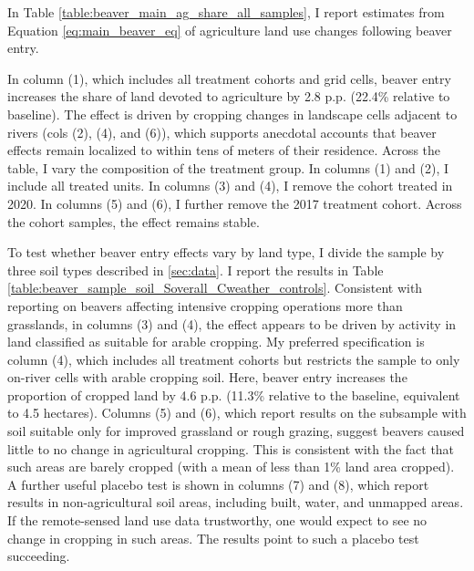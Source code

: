 In Table \ref{table:beaver_main_ag_share_all_samples}, I report estimates from Equation \ref{eq:main_beaver_eq} of agriculture land use changes following beaver entry. 

In column (1), which includes all treatment cohorts and grid cells, beaver entry increases the share of land devoted to agriculture by 2.8 p.p. (22.4\% relative to baseline). The effect is driven by cropping changes in landscape cells adjacent to rivers (cols (2), (4), and (6)), which supports anecdotal accounts that beaver effects remain localized to within tens of meters of their residence. Across the table, I vary the composition of the treatment group. In columns (1) and (2), I include all treated units. In columns (3) and (4), I remove the cohort treated in 2020. In columns (5) and (6), I further remove the 2017 treatment cohort. Across the cohort samples, the effect remains stable. 



To test whether beaver entry effects vary by land type, I divide the sample by three soil types described in \ref{sec:data}. I report the results in Table \ref{table:beaver_sample_soil_Soverall_Cweather_controls}. Consistent with reporting on beavers affecting intensive cropping operations more than grasslands, in columns (3) and (4), the effect appears to be driven by activity in land classified as suitable for arable cropping. My preferred specification is column (4), which includes all treatment cohorts but restricts the sample to only on-river cells with arable cropping soil. Here, beaver entry increases the proportion of cropped land by 4.6 p.p. (11.3\% relative to the baseline, equivalent to 4.5 hectares). Columns (5) and (6), which report results on the subsample with soil suitable only for improved grassland or rough grazing, suggest beavers caused little to no change in agricultural cropping. This is consistent with the fact that such areas are barely cropped (with a mean of less than 1\% land area cropped). A further useful placebo test is shown in columns (7) and (8), which report results in non-agricultural soil areas, including built, water, and unmapped areas. If the remote-sensed land use data trustworthy, one would expect to see no change in cropping in such areas. The results point to such a placebo test succeeding. 



